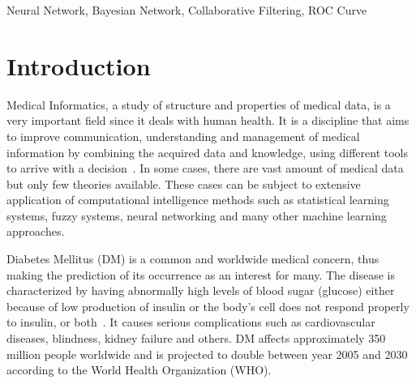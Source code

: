 \documentclass[journal]{./IEEE/IEEEtran}
\title{\SPTITLE}
\author{\ADVISEE~and~\ADVISER%
\REMARK
}
\begin{document}
	\maketitle

\begin{abstract}
Machine Learning is a  study of systems that allows learning and prediction based from a data. Implementing Machine Learning for medical purposes  is one of its useful and important applications. Diabetes Mellitus is a major health concern worldwide. This paper presents a way to improve data evaluation on Diabetes Mellitus by using different machine learning approaches, namely: Neural Networks, Bayesian Networks, and Collaborative Filtering.
\end{abstract}

\begin{keywords}
Neural Network, Bayesian Network, Collaborative Filtering, ROC Curve
\end{keywords}

\section{Introduction}
	Medical Informatics, a study of structure and properties of medical data, is a very important field since it deals with human health. It is a discipline that aims to improve communication, understanding and management of medical information by combining the acquired data and knowledge, using different tools to arrive with a decision~\cite{Medical12}. In some cases, there are vast amount of medical data but only few theories available. These cases can be subject to extensive application of computational intelligence methods such as statistical learning systems, fuzzy systems, neural networking and many other machine learning approaches. 

	Diabetes Mellitus (DM) is a common and worldwide medical concern, thus making the prediction of its occurrence  as an interest for many. The disease is characterized by having abnormally high levels of blood sugar (glucose) either because of low production of insulin or the body's cell does not respond properly to insulin, or both~\cite{Diabetes13}. It causes serious complications such as cardiovascular diseases, blindness, kidney failure and others. DM affects approximately 350 million people worldwide and is projected to double between year 2005 and 2030 according to the World Health Organization (WHO).
\end{document}
